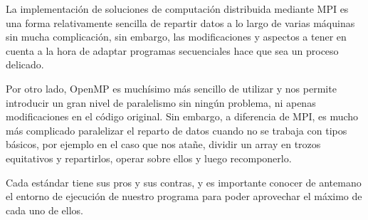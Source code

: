 \documentclass[12pt]{report} %
\begin{document}
La implementación de soluciones de computación distribuida mediante MPI es una forma relativamente sencilla
de repartir datos a lo largo de varias máquinas sin mucha complicación, sin embargo, las modificaciones y aspectos
a tener en cuenta a la hora de adaptar programas secuenciales hace que sea un proceso delicado.

Por otro lado, OpenMP es muchísimo más sencillo de utilizar y nos permite introducir un gran nivel de
paralelismo sin ningún problema, ni apenas modificaciones en el código original. Sin embargo, a diferencia
de MPI, es mucho más complicado paralelizar el reparto de datos cuando no se trabaja con tipos básicos,
por ejemplo en el caso que nos atañe, dividir un array en trozos equitativos y repartirlos, operar sobre
ellos y luego recomponerlo.

Cada estándar tiene sus pros y sus contras, y es importante conocer de antemano el entorno de ejecución de
nuestro programa para poder aprovechar el máximo de cada uno de ellos.


\nocite{*} %

\clearpage
{}
\printbibliography
\end{document}
